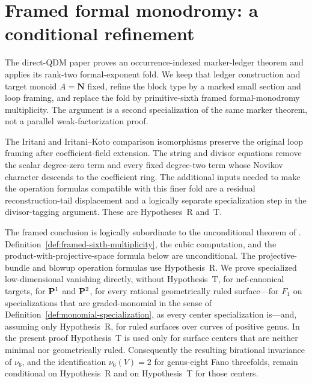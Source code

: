 \section{Framed formal monodromy: a conditional refinement}
\label{sec:framed-monodromy}

The direct-QDM paper \cite{RuddM1} proves an occurrence-indexed marker-ledger
theorem and applies its rank-two formal-exponent fold.  We keep that ledger
construction and target monoid \(A=\mathbf N\) fixed, refine the block type by
a marked small section and loop framing, and replace the fold by
primitive-sixth framed formal-monodromy multiplicity.  The argument is a
second specialization of the same marker theorem, not a parallel
weak-factorization proof.

The Iritani and Iritani--Koto comparison isomorphisms preserve the original
loop framing after coefficient-field extension.  The string and divisor
equations remove the scalar degree-zero term and every fixed degree-two term
whose Novikov character descends to the coefficient ring.  The additional
inputs needed to make the operation formulas compatible with this finer fold
are a residual reconstruction-tail displacement and a logically separate
specialization step in the divisor-tagging argument.  These are
Hypotheses~R and~T.

The framed conclusion is logically subordinate to the unconditional theorem
of \cite{RuddM1}.  Definition~\ref{def:framed-sixth-multiplicity},
the cubic computation, and the product-with-projective-space formula below
are unconditional.  The projective-bundle and blowup operation formulas
use Hypothesis~R.  We prove specialized low-dimensional vanishing
directly, without Hypothesis~T, for nef-canonical targets, for
\(\mathbf P^1\) and \(\mathbf P^2\), for every rational geometrically ruled surface---for
\(F_1\) on specializations that are graded-monomial in the sense of
Definition~\ref{def:monomial-specialization}, as every center specialization
is---and, assuming only Hypothesis~R, for ruled surfaces over curves of
positive genus.  In the present proof Hypothesis~T is used only
for surface centers that are neither minimal nor geometrically ruled.
Consequently the resulting birational invariance
of \(\nu_6\), and the identification \(\nu_6(V)=2\) for genus-eight Fano
threefolds, remain conditional on Hypothesis~R and on Hypothesis~T for
those centers.


